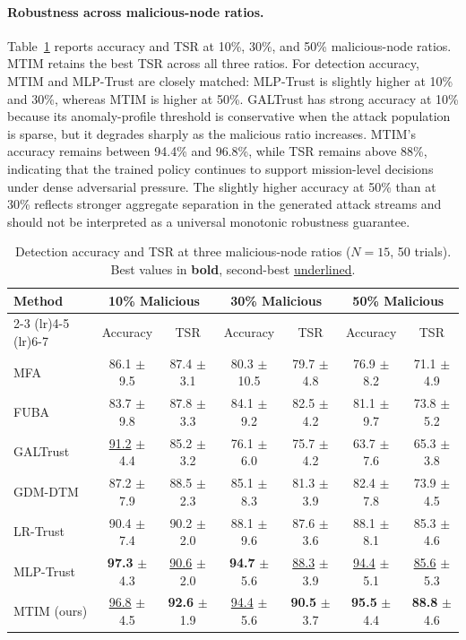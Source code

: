 \documentclass[notspecified,article,submit,moreauthors]{Definitions/mdpi}
\begin{document}
\paragraph{Robustness across malicious-node ratios.}
Table~\ref{tab:multi_ratio} reports accuracy and TSR at 10\%, 30\%, and 50\% malicious-node ratios. MTIM retains the best TSR across all three ratios. For detection accuracy, MTIM and MLP-Trust are closely matched: MLP-Trust is slightly higher at 10\% and 30\%, whereas MTIM is higher at 50\%. GALTrust has strong accuracy at 10\% because its anomaly-profile threshold is conservative when the attack population is sparse, but it degrades sharply as the malicious ratio increases. MTIM's accuracy remains between 94.4\% and 96.8\%, while TSR remains above 88\%, indicating that the trained policy continues to support mission-level decisions under dense adversarial pressure. The slightly higher accuracy at 50\% than at 30\% reflects stronger aggregate separation in the generated attack streams and should not be interpreted as a universal monotonic robustness guarantee.

\begin{table}[!htbp]
  \centering
  \caption{Detection accuracy and TSR at three malicious-node ratios ($N = 15$, 50 trials). Best values in \textbf{bold}, second-best \underline{underlined}.}
  \label{tab:multi_ratio}
  \footnotesize
  \setlength{\tabcolsep}{5pt}
  \renewcommand{\arraystretch}{1.15}
  \begin{tabular}{l c c c c c c}
    \toprule
    \multirow{2}{*}{Method} & \multicolumn{2}{c}{10\% Malicious} & \multicolumn{2}{c}{30\% Malicious} & \multicolumn{2}{c}{50\% Malicious} \\
    \cmidrule(lr){2-3} \cmidrule(lr){4-5} \cmidrule(lr){6-7}
    & Accuracy & TSR & Accuracy & TSR & Accuracy & TSR \\
    \midrule
    MFA & 86.1 $\pm$ 9.5 & 87.4 $\pm$ 3.1 & 80.3 $\pm$ 10.5 & 79.7 $\pm$ 4.8 & 76.9 $\pm$ 8.2 & 71.1 $\pm$ 4.9 \\
    FUBA & 83.7 $\pm$ 9.8 & 87.8 $\pm$ 3.3 & 84.1 $\pm$ 9.2 & 82.5 $\pm$ 4.2 & 81.1 $\pm$ 9.7 & 73.8 $\pm$ 5.2 \\
    GALTrust & \underline{91.2} $\pm$ 4.4 & 85.2 $\pm$ 3.2 & 76.1 $\pm$ 6.0 & 75.7 $\pm$ 4.2 & 63.7 $\pm$ 7.6 & 65.3 $\pm$ 3.8 \\
    GDM-DTM & 87.2 $\pm$ 7.9 & 88.5 $\pm$ 2.3 & 85.1 $\pm$ 8.3 & 81.3 $\pm$ 3.9 & 82.4 $\pm$ 7.8 & 73.9 $\pm$ 4.5 \\
    LR-Trust & 90.4 $\pm$ 7.4 & 90.2 $\pm$ 2.0 & 88.1 $\pm$ 9.6 & 87.6 $\pm$ 3.6 & 88.1 $\pm$ 8.1 & 85.3 $\pm$ 4.6 \\
    MLP-Trust & \textbf{97.3} $\pm$ 4.3 & \underline{90.6} $\pm$ 2.0 & \textbf{94.7} $\pm$ 5.6 & \underline{88.3} $\pm$ 3.9 & \underline{94.4} $\pm$ 5.1 & \underline{85.6} $\pm$ 5.3 \\
    MTIM (ours) & \underline{96.8} $\pm$ 4.5 & \textbf{92.6} $\pm$ 1.9 & \underline{94.4} $\pm$ 5.6 & \textbf{90.5} $\pm$ 3.7 & \textbf{95.5} $\pm$ 4.4 & \textbf{88.8} $\pm$ 4.6 \\
    \bottomrule
  \end{tabular}
\end{table}
\end{document}

